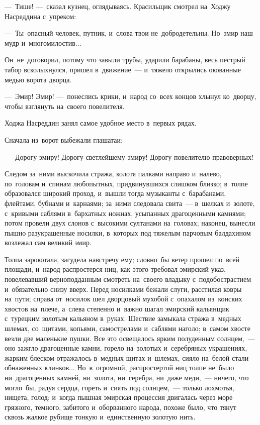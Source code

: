 \documentclass[12pt,a4paper]{book}
\begin{document}
—~Тише! —~сказал кузнец, оглядываясь. Красильщик смотрел на~Ходжу Насреддина с~упреком:

—~Ты~опасный человек, путник, и~слова твои не~добродетельны. Но~эмир наш мудр и~многомилостив...

Он~не~договорил, потому что завыли трубы, ударили барабаны, весь пестрый табор всколыхнулся, пришел в~движение~— и~тяжело открылись окованные медью ворота дворца.

—~Эмир! Эмир! —~понеслись крики, и~народ со~всех концов хлынул ко~дворцу, чтобы взглянуть на~своего повелителя.

Ходжа Насреддин занял самое удобное место в~первых рядах.

Сначала из~ворот выбежали глашатаи:

—~Дорогу эмиру! Дорогу светлейшему эмиру! Дорогу повелителю правоверных!

Следом за~ними выскочила стража, колотя палками направо и~налево, по~головам и~спинам любопытных, придвинувшихся слишком близко; в~толпе образовался широкий проход, и~вышли тогда музыканты с~барабанами, флейтами, бубнами и~карнаями; за~ними следовала свита~— в~шелках и~золоте, с~кривыми саблями в~бархатных ножнах, усыпанных драгоценными камнями; потом провели двух слонов с~высокими султанами на~головах; наконец, вынесли пышно разукрашенные носилки, в~которых под тяжелым парчовым балдахином возлежал сам великий эмир.

Толпа зарокотала, загудела навстречу ему; словно~бы ветер прошел по~всей площади, и~народ распростерся ниц, как этого требовал эмирский указ, повелевавший верноподданным смотреть на~своего владыку с~подобострастием и~обязательно снизу вверх. Перед носилками бежали слуги, расстилая ковры на~пути; справа от~носилок шел дворцовый мухобой с~опахалом из~конских хвостов на~плече, а~слева степенно и~важно шагал эмирский кальянщик с~турецким золотым кальяном в~руках. Шествие замыкала стража в~медных шлемах, со~щитами, копьями, самострелами и~саблями наголо; в~самом хвосте везли две маленькие пушки. Все это освещалось ярким полуденным солнцем,~— оно зажгло драгоценные камни, горело на~золотых и~серебряных украшениях, жарким блеском отражалось в~медных щитах и~шлемах, сияло на~белой стали обнаженных клинков... Но~в~огромной, распростертой ниц толпе не~было ни~драгоценных камней, ни~золота, ни~серебра, ни~даже меди,~— ничего, что могло~бы, радуя сердца, гореть и~сиять под солнцем,~— только лохмотья, нищета, голод; и~когда пышная эмирская процессия двигалась через море грязного, темного, забитого и~оборванного народа, похоже было, что тянут сквозь жалкое рубище тонкую и~единственную золотую нить.
\end{document}
